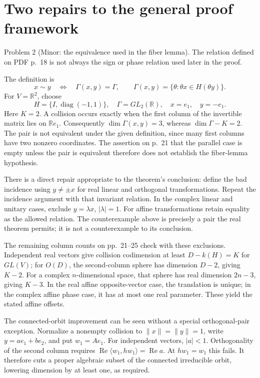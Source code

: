\documentclass[10pt]{article}
\begin{document}
\section*{Two repairs to the general proof framework}
Problem 2 (Minor: the equivalence used in the fiber lemma).  The relation defined on PDF p. 18 is not always the sign or phase relation used later in the proof.\par
The definition is \[x\sim y\quad\Longleftrightarrow\quad
 \Gamma(x,y)=\Gamma,\qquad
 \Gamma(x,y)=\{\theta:\theta x\in H(\theta y)\}.\] For \(V=\mathbb R^2\), choose \[H=\{I,\operatorname{diag}(-1,1)\},\quad
 \Gamma=GL_2(\mathbb R),\quad x=e_1,\quad y=-e_1.\] Here \(K=2\). A collision occurs exactly when the first column of the invertible matrix lies on \(\mathbb R e_1\). Consequently \(\dim\Gamma(x,y)=3\), whereas \(\dim\Gamma-K=2\). The pair is not equivalent under the given definition, since many first columns have two nonzero coordinates. The assertion on p. 21 that the parallel case is empty unless the pair is equivalent therefore does not establish the fiber-lemma hypothesis.\par
There is a direct repair appropriate to the theorem’s conclusion: define the bad incidence using \(y\ne\pm x\) for real linear and orthogonal transformations. Repeat the incidence argument with that invariant relation. In the complex linear and unitary cases, exclude \(y=\lambda x\), \(|\lambda|=1\). For affine transformations retain equality as the allowed relation. The counterexample above is precisely a pair the real theorem permits; it is not a counterexample to its conclusion.\par
The remaining column counts on pp. 21–25 check with these exclusions. Independent real vectors give collision codimension at least \(D-k(H)=K\) for \(GL(V)\); for \(O(D)\), the second-column sphere has dimension \(D-2\), giving \(K-2\). For a complex \(n\)-dimensional space, that sphere has real dimension \(2n-3\), giving \(K-3\). In the real affine opposite-vector case, the translation is unique; in the complex affine phase case, it has at most one real parameter. These yield the stated affine offsets.\par
The connected-orbit improvement can be seen without a special orthogonal-pair exception. Normalize a nonempty collision to \(\|x\|=\|y\|=1\), write \(y=ae_1+be_2\), and put \(w_1=Ae_1\). For independent vectors, \(|a|<1\). Orthogonality of the second column requires \(\operatorname{Re}\langle w_1,hw_1\rangle=\operatorname{Re}a\). At \(hw_1=w_1\) this fails. It therefore cuts a proper algebraic subset of the connected irreducible orbit, lowering dimension by at least one, as required.\par
\end{document}
